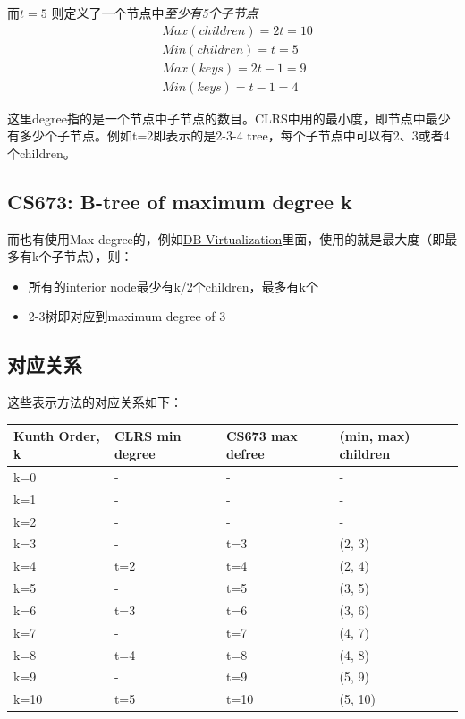\documentclass[12pt]{article}
\begin{document}
而\({\displaystyle t=5}\) 则定义了一个节点中\emph{至少有5个子节点}
\begin{align}
&Max(children) = 2t = 10 \\
&Min(children) = t = 5 \\
&Max(keys) = 2t -1 = 9 \\
&Min(keys) = t - 1 = 4
\end{align}

这里degree指的是一个节点中子节点的数目。CLRS中用的最小度，即节点中最少有多少个子节点。例如t=2即表示的是2-3-4 tree，每个子节点中可以有2、3或者4个children。

\subsection{CS673: B-tree of maximum degree k}\label{cs673-b-tree-of-maximum-degree-k}

而也有使用Max degree的，例如\href{https://www.cs.usfca.edu/~galles/visualization/BTree.html}{DB Virtualization}里面，使用的就是最大度（即最多有k个子节点），则：

\begin{itemize}
\tightlist
\item
  所有的interior node最少有k/2个children，最多有k个
\item
  2-3树即对应到maximum degree of 3
\end{itemize}

\subsection{对应关系}\label{ux5bf9ux5e94ux5173ux7cfb}

这些表示方法的对应关系如下：

{\def\LTcaptype{none} %
\begin{longtable}[]{@{}llll@{}}
\toprule\noalign{}
Kunth Order, k & CLRS min degree & CS673 max defree & (min, max) children \\
\midrule\noalign{}
\endhead
\bottomrule\noalign{}
\endlastfoot
k=0 & - & - & - \\
k=1 & - & - & - \\
k=2 & - & - & - \\
k=3 & - & t=3 & (2, 3) \\
k=4 & t=2 & t=4 & (2, 4) \\
k=5 & - & t=5 & (3, 5) \\
k=6 & t=3 & t=6 & (3, 6) \\
k=7 & - & t=7 & (4, 7) \\
k=8 & t=4 & t=8 & (4, 8) \\
k=9 & - & t=9 & (5, 9) \\
k=10 & t=5 & t=10 & (5, 10) \\
\end{longtable}
}
\end{document}
